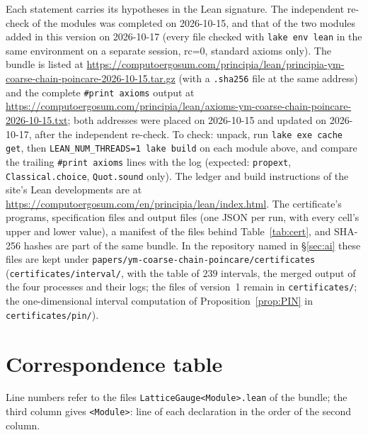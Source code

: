 \documentclass[11pt,a4paper]{article}
\theoremstyle{definition}
\theoremstyle{remark}
\newcommand{\code}[1]{\texttt{#1}}
\newcommand{\bundleurl}{https://computoergosum.com/principia/lean/principia-ym-coarse-chain-poincare-2026-10-15.tar.gz}
\newcommand{\axiomsurl}{https://computoergosum.com/principia/lean/axioms-ym-coarse-chain-poincare-2026-10-15.txt}
\begin{document}
Each statement carries its hypotheses in the Lean signature. The independent re-check of the modules was completed on 2026-10-15, and that of the two modules added in this version on 2026-10-17 (every file checked with \code{lake env lean} in the same environment on a separate session, rc=0, standard axioms only). The bundle is listed at \url{\bundleurl} (with a \code{.sha256} file at the same address) and the complete \code{\#print axioms} output at \url{\axiomsurl}; both addresses were placed on 2026-10-15 and updated on 2026-10-17, after the independent re-check. To check: unpack, run \code{lake exe cache get}, then \code{LEAN\_NUM\_THREADS=1 lake build} on each module above, and compare the trailing \code{\#print axioms} lines with the log (expected: \code{propext}, \code{Classical.choice}, \code{Quot.sound} only). The ledger and build instructions of the site's Lean developments are at \url{https://computoergosum.com/en/principia/lean/index.html}. The certificate's programs, specification files and output files (one JSON per run, with every cell's upper and lower value), a manifest of the files behind Table~\ref{tab:cert}, and SHA-256 hashes are part of the same bundle. In the repository named in \S\ref{sec:ai} these files are kept under \code{papers/\allowbreak{}ym-coarse-chain-poincare/\allowbreak{}certificates} (\code{certificates/\allowbreak{}interval/}, with the table of $239$ intervals, the merged output of the four processes and their logs; the files of version~1 remain in \code{certificates/}; the one-dimensional interval computation of Proposition~\ref{prop:PIN} in \code{certificates/\allowbreak{}pin/}).\par\endgroup

\section{Correspondence table}\label{sec:corr}

Line numbers refer to the files \code{LatticeGauge<Module>.lean} of the bundle; the third column gives \code{<Module>}: line of each declaration in the order of the second column.
\end{document}
